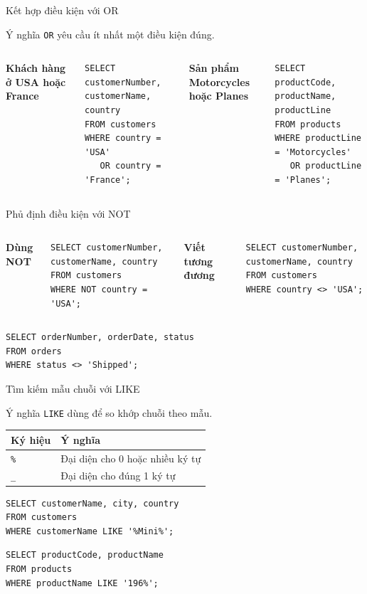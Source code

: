 \documentclass[aspectratio=169,11pt]{beamer}
\newcommand{\kw}[1]{\textcolor{sqlblue}{\texttt{#1}}}
\newcommand{\minihead}[1]{\vspace{2pt}\textbf{#1}\vspace{2pt}}
\begin{document}
\begin{frame}[fragile]{Kết hợp điều kiện với OR}
\begin{block}{Ý nghĩa}
\kw{OR} yêu cầu ít nhất một điều kiện đúng.
\end{block}
\begin{columns}[T]
\minihead{Khách hàng ở USA hoặc France}
\begin{lstlisting}
SELECT customerNumber, customerName, country
FROM customers
WHERE country = 'USA'
   OR country = 'France';
\end{lstlisting}
\minihead{Sản phẩm Motorcycles hoặc Planes}
\begin{lstlisting}
SELECT productCode, productName, productLine
FROM products
WHERE productLine = 'Motorcycles'
   OR productLine = 'Planes';
\end{lstlisting}
\end{columns}
\end{frame}

\begin{frame}[fragile]{Phủ định điều kiện với NOT}
\begin{columns}[T]
\minihead{Dùng NOT}
\begin{lstlisting}
SELECT customerNumber, customerName, country
FROM customers
WHERE NOT country = 'USA';
\end{lstlisting}
\minihead{Viết tương đương}
\begin{lstlisting}
SELECT customerNumber, customerName, country
FROM customers
WHERE country <> 'USA';
\end{lstlisting}
\end{columns}
\vspace{5pt}
\begin{lstlisting}
SELECT orderNumber, orderDate, status
FROM orders
WHERE status <> 'Shipped';
\end{lstlisting}
\end{frame}

\begin{frame}[fragile]{Tìm kiếm mẫu chuỗi với LIKE}
\begin{block}{Ý nghĩa}
\kw{LIKE} dùng để so khớp chuỗi theo mẫu.
\end{block}
\begin{center}
\begin{tabular}{ll}
\toprule
\textbf{Ký hiệu} & \textbf{Ý nghĩa} \\
\midrule
\texttt{\%} & Đại diện cho 0 hoặc nhiều ký tự \\
\texttt{\_} & Đại diện cho đúng 1 ký tự \\
\bottomrule
\end{tabular}
\end{center}
\begin{lstlisting}
SELECT customerName, city, country
FROM customers
WHERE customerName LIKE '%Mini%';
\end{lstlisting}
\begin{lstlisting}
SELECT productCode, productName
FROM products
WHERE productName LIKE '196%';
\end{lstlisting}
\end{frame}
\end{document}
